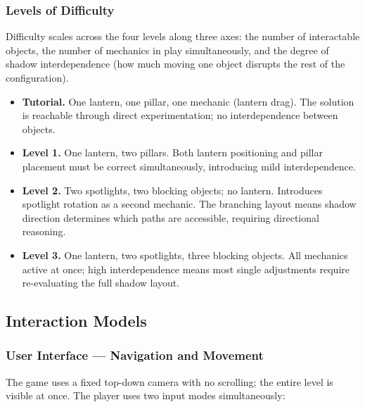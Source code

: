 \documentclass[11pt, letterpaper]{article}
\begin{document}
        \subsubsection{Levels of Difficulty}
        Difficulty scales across the four levels along three axes: the number of
        interactable objects, the number of mechanics in play simultaneously, and the
        degree of shadow interdependence (how much moving one object disrupts the rest
        of the configuration).

        \begin{itemize}[leftmargin=1.5em, itemsep=2pt]
            \item \textbf{Tutorial.} One lantern, one pillar, one mechanic (lantern drag).
                  The solution is reachable through direct experimentation; no
                  interdependence between objects.
            \item \textbf{Level 1.} One lantern, two pillars. Both lantern positioning
                  and pillar placement must be correct simultaneously, introducing mild
                  interdependence.
            \item \textbf{Level 2.} Two spotlights, two blocking objects; no lantern.
                  Introduces spotlight rotation as a second mechanic. The branching
                  layout means shadow direction determines which paths are accessible,
                  requiring directional reasoning.
            \item \textbf{Level 3.} One lantern, two spotlights, three blocking objects.
                  All mechanics active at once; high interdependence means most single
                  adjustments require re-evaluating the full shadow layout.
        \end{itemize}

    \subsection{Interaction Models}

        \subsubsection{User Interface --- Navigation and Movement}
        The game uses a fixed top-down camera with no scrolling; the entire level is
        visible at once. The player uses two input modes simultaneously:
\end{document}

